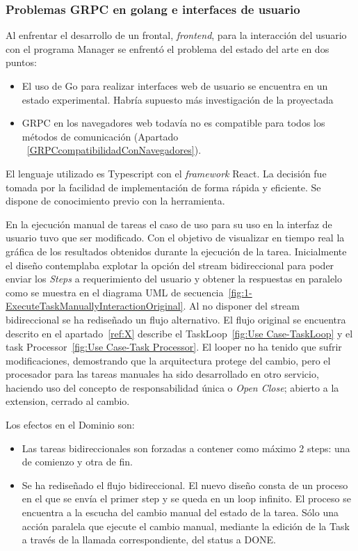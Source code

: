 
\subsubsection{Problemas GRPC en golang e interfaces de usuario}\label{subsubsec:problemas-rpc-en-golang}

Al enfrentar el desarrollo de un frontal, \textit{frontend}, para la interacción del usuario con el programa Manager se enfrentó el problema del estado del arte en dos puntos:
\begin{itemize}
    \item El uso de Go para realizar interfaces web de usuario se encuentra en un estado experimental.
    Habría supuesto más investigación de la proyectada
    \item GRPC en los navegadores web todavía no es compatible para todos los métodos de comunicación (Apartado ~\ref{GRPCcompatibilidadConNavegadores}).
\end{itemize}

El lenguaje utilizado es Typescript con el \textit{framework} React.
La decisión fue tomada por la facilidad de implementación de forma rápida y eficiente.
Se dispone de conocimiento previo con la herramienta.

En la ejecución manual de tareas el caso de uso para su uso en la interfaz de usuario tuvo que ser modificado.
Con el objetivo de visualizar en tiempo real la gráfica de los resultados obtenidos durante la ejecución de la tarea.
Inicialmente el diseño contemplaba explotar la opción del stream bidireccional para poder enviar los \textit{Steps} a requerimiento del usuario y obtener la respuestas en paralelo como se muestra en el diagrama UML de secuencia~\cref{fig:1-ExecuteTaskManuallyInteractionOriginal}.
Al no disponer del stream bidireccional se ha rediseñado un flujo alternativo.
El flujo original se encuentra descrito en el apartado~\ref{ref:X} describe el TaskLoop~\cref{fig:Use Case-TaskLoop} y el task Processor~\cref{fig:Use Case-Task Processor}.
El looper no ha tenido que sufrir modificaciones, demostrando que la arquitectura protege del cambio, pero el procesador para las tareas manuales ha sido desarrollado en otro servicio, haciendo uso del concepto de responsabilidad única o \textit{Open Close};
abierto a la extension, cerrado al cambio.

Los efectos en el Dominio son:
\begin{itemize}
    \item Las tareas bidireccionales son forzadas a contener como máximo 2 steps: una de comienzo y otra de fin.
    \item Se ha rediseñado el flujo bidireccional.
    El nuevo diseño consta de un proceso en el que se envía el primer step y se queda en un loop infinito.
    El proceso se encuentra a la escucha del cambio manual del estado de la tarea.
    Sólo una acción paralela que ejecute el cambio manual, mediante la edición de la Task a través de la llamada correspondiente, del status a DONE\@.
\end{itemize}

